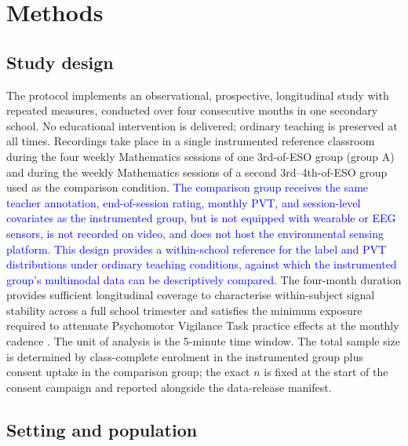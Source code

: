 \section{Methods}\label{sec:methods}

\subsection{Study design}\label{subsec:design}

The protocol implements an observational, prospective, longitudinal study with repeated measures, conducted over four consecutive months in one secondary school. No educational intervention is delivered; ordinary teaching is preserved at all times. Recordings take place in a single instrumented reference classroom during the four weekly Mathematics sessions of one 3rd-of-ESO group (group A) and during the weekly Mathematics sessions of a second 3rd–4th-of-ESO group used as the comparison condition. \textcolor{blue}{The comparison group receives the same teacher annotation, end-of-session rating, monthly PVT, and session-level covariates as the instrumented group, but is not equipped with wearable or EEG sensors, is not recorded on video, and does not host the environmental sensing platform. This design provides a within-school reference for the label and PVT distributions under ordinary teaching conditions, against which the instrumented group's multimodal data can be descriptively compared.} The four-month duration provides sufficient longitudinal coverage to characterise within-subject signal stability across a full school trimester and satisfies the minimum exposure required to attenuate Psychomotor Vigilance Task practice effects at the monthly cadence \parencite{Basner2018_pvt_practice}. The unit of analysis is the 5-minute time window. The total sample size is determined by class-complete enrolment in the instrumented group plus consent uptake in the comparison group; the exact $n$ is fixed at the start of the consent campaign and reported alongside the data-release manifest.

\subsection{Setting and population}\label{subsec:population}

